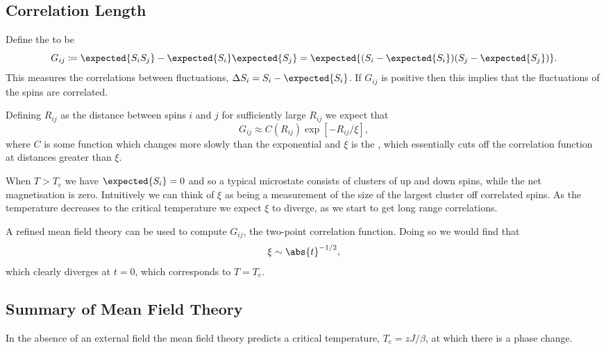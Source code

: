 \documentclass[fleqn]{NotesClass}
\begin{document}
    \subsection{Correlation Length}
    Define the  to be
    \begin{equation}
        G_{ij} \coloneqq \expected{S_iS_j} - \expected{S_i}\expected{S_j} = \expected{(S_i - \expected{S_i})(S_j - \expected{S_j})}.
    \end{equation}
    This measures the correlations between fluctuations, \(\Delta S_i = S_i - \expected{S_i}\).
    If \(G_{ij}\) is positive then this implies that the fluctuations of the spins are correlated.
    
    Defining \(R_{ij}\) as the distance between spins \(i\) and \(j\) for sufficiently large \(R_{ij}\) we expect that 
    \begin{equation}
        G_{ij} \approx C(R_{ij}) \exp[-R_{ij}/\xi],
    \end{equation}
    where \(C\) is some function which changes more slowly than the exponential and \(\xi\) is the , which essentially cuts off the correlation function at distances greater than \(\xi\).
    
    When \(T > T_{\mathrm{c}}\) we have \(\expected{S_i} = 0\) and so a typical microstate consists of clusters of up and down spins, while the net magnetisation is zero.
    Intuitively we can think of \(\xi\) as being a measurement of the size of the largest cluster off correlated spins.
    As the temperature decreases to the critical temperature we expect \(\xi\) to diverge, as we start to get long range correlations.
    
    A refined mean field theory can be used to compute \(G_{ij}\), the two-point correlation function.
    Doing so we would find that
    \begin{equation}
        \xi \sim \abs{t}^{-1/2},
    \end{equation}
    which clearly diverges at \(t = 0\), which corresponds to \(T = T_{\mathrm{c}}\).
    
    \subsection{Summary of Mean Field Theory}
    In the absence of an external field the mean field theory predicts a critical temperature, \(T_{\mathrm{c}} = zJ/\beta\), at which there is a phase change.
    
\end{document}
